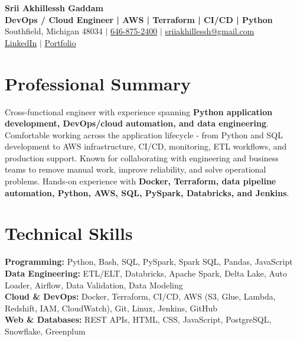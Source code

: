\documentclass[letterpaper,10pt]{article}
\begin{document}
\fontsize{9.35pt}{10.45pt}\selectfont

\begin{center}
    {\LARGE \textbf{Srii Akhillessh Gaddam}} \\[-1pt]
    \textbf{DevOps / Cloud Engineer | AWS | Terraform | CI/CD | Python} \\[2pt]
    Southfield, Michigan 48034 $|$
    \href{tel:6468752400}{646-875-2400} $|$
    \href{mailto:sriiakhillessh@gmail.com}{sriiakhillessh@gmail.com} \\[1pt]
    \href{https://www.linkedin.com/in/srii-akhiilessh-gaddam-b48668191/}{LinkedIn} $|$
    \href{https://sriiakhillesshg.github.io/portfolio/}{Portfolio}
\end{center}
\vspace{-8pt}

\section{Professional Summary}
\small{Cross-functional engineer with experience spanning \textbf{Python application development, DevOps/cloud automation, and data engineering}. Comfortable working across the application lifecycle - from Python and SQL development to AWS infrastructure, CI/CD, monitoring, ETL workflows, and production support. Known for collaborating with engineering and business teams to remove manual work, improve reliability, and solve operational problems. Hands-on experience with \textbf{Docker, Terraform, data pipeline automation, Python, AWS, SQL, PySpark, Databricks, and Jenkins}.}

\section{Technical Skills}
\small{
\textbf{Programming:} Python, Bash, SQL, PySpark, Spark SQL, Pandas, JavaScript \\
\textbf{Data Engineering:} ETL/ELT, Databricks, Apache Spark, Delta Lake, Auto Loader, Airflow, Data Validation, Data Modeling \\
\textbf{Cloud \& DevOps:} Docker, Terraform, CI/CD, AWS (S3, Glue, Lambda, Redshift, IAM, CloudWatch), Git, Linux, Jenkins, GitHub \\
\textbf{Web \& Databases:} REST APIs, HTML, CSS, JavaScript, PostgreSQL, Snowflake, Greenplum
}
\end{document}
